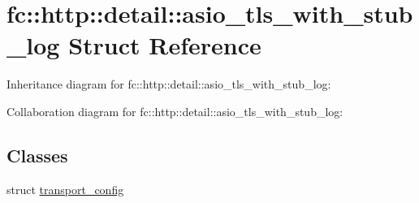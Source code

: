\hypertarget{structfc_1_1http_1_1detail_1_1asio__tls__with__stub__log}{}\section{fc\+:\+:http\+:\+:detail\+:\+:asio\+\_\+tls\+\_\+with\+\_\+stub\+\_\+log Struct Reference}
\label{structfc_1_1http_1_1detail_1_1asio__tls__with__stub__log}


Inheritance diagram for fc\+:\+:http\+:\+:detail\+:\+:asio\+\_\+tls\+\_\+with\+\_\+stub\+\_\+log\+:


Collaboration diagram for fc\+:\+:http\+:\+:detail\+:\+:asio\+\_\+tls\+\_\+with\+\_\+stub\+\_\+log\+:
\subsection*{Classes}
\begin{DoxyCompactItemize}
\item 
struct \mbox{\hyperlink{structfc_1_1http_1_1detail_1_1asio__tls__with__stub__log_1_1transport__config}{transport\+\_\+config}}
\end{DoxyCompactItemize}
